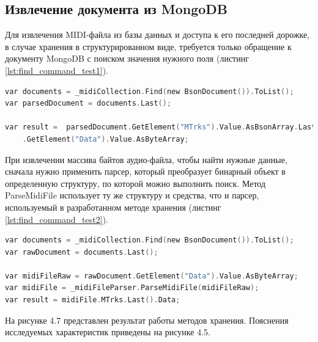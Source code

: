 \subsection{Извлечение документа из MongoDB}

Для извлечения MIDI-файла из базы данных и доступа к его последней дорожке, в случае хранения в структурированном виде, требуется только обращение к документу MongoDB с поиском значения нужного поля (листинг \ref{lst:find_command_test1}). 

\newpage

\begin{lstlisting}[language=C, label=some-code, caption=Извлечение MIDI-файла из MongoDB c использованием реализованного метода, label=lst:find_command_test1]
var documents = _midiCollection.Find(new BsonDocument()).ToList();
var parsedDocument = documents.Last();

var result =  parsedDocument.GetElement("MTrks").Value.AsBsonArray.Last().AsBsonDocument
    .GetElement("Data").Value.AsByteArray;
\end{lstlisting}

При извлечении массива байтов аудио-файла, чтобы найти нужные данные, сначала нужно применить парсер, который преобразует бинарный объект в определенную структуру, по которой можно выполнить поиск. Метод ParseMidiFile использует ту же структуру и средства, что и парсер, используемый в разработанном методе хранения (листинг \ref{lst:find_command_test2}).

\begin{lstlisting}[language=C, label=some-code, caption=Извлечение MIDI-файла из MongoDB в виде массива байтов, label=lst:find_command_test2]
var documents = _midiCollection.Find(new BsonDocument()).ToList();
var rawDocument = documents.Last();

var midiFileRaw = rawDocument.GetElement("Data").Value.AsByteArray;
var midiFile = _midiFileParser.ParseMidiFile(midiFileRaw);
var result = midiFile.MTrks.Last().Data;
\end{lstlisting}

На рисунке 4.7 представлен результат работы методов хранения. Пояснения исследуемых характеристик приведены на рисунке 4.5.

